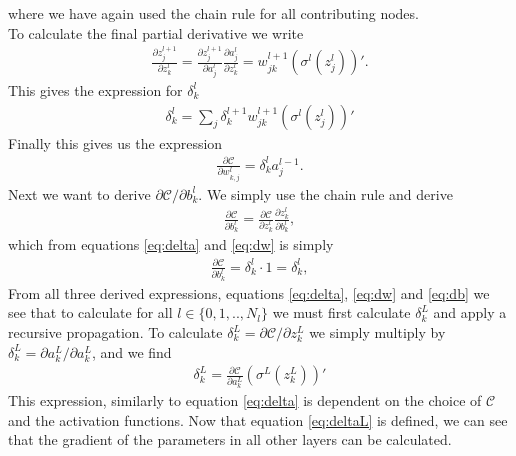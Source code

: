 where we have again used the chain rule for all contributing nodes.
\\
To calculate the final partial derivative we write
\begin{align*}
    \frac{\partial z_j^{l+1}}{\partial z^l_k} = \frac{\partial z_j^{l+1}}{\partial a^l_j}\frac{\partial a^l_j}{\partial z^l_k}
                                              = w_{jk}^{l+1}(\sigma^l(z_j^l))'.
\end{align*}
This gives the expression for $\delta_k^l$
\begin{align}\label{eq:delta}
    \delta_k^l  = \sum_j \delta_k^{l+1}w_{jk}^{l+1}(\sigma^l(z_j^l))'  
\end{align}
Finally this gives us the expression
\begin{align}\label{eq:dw}
    \frac{\partial \mathcal{C}}{\partial w_{k,j}^l} = \delta_k^{l} a_j^{l-1}.
\end{align}
Next we want to derive $\partial \mathcal{C}/\partial b^l_k$. We simply use the chain rule and derive
\begin{align*}
    \frac{\partial \mathcal{C}}{\partial b^l_k} = \frac{\partial \mathcal{C}}{\partial z^l_k}\frac{\partial z_k^l}{\partial b^l_k},
\end{align*}
which from equations \ref{eq:delta} and \ref{eq:dw} is simply
\begin{align}\label{eq:db}
    \frac{\partial \mathcal{C}}{\partial b^l_k} = \delta_k^{l} \cdot 1 = \delta_k^{l},
\end{align}
From all three derived expressions, equations \ref{eq:delta}, \ref{eq:dw} and \ref{eq:db} we see that 
to calculate for all $l\in\{0,1,..,N_l\}$ we must first calculate $\delta_k^L$ and apply a recursive propagation.
To calculate $\delta_k^L = \partial \mathcal{C}/\partial z^L_k$ we simply multiply by $\delta_k^L = \partial a_k^L/\partial a_k^L$, and we find
\begin{align}\label{eq:deltaL}
    \delta_k^L = \frac{\partial \mathcal{C}}{\partial a^L_k}\left(\sigma^L(z_k^L)\right)'
\end{align}
This expression, similarly to equation \ref{eq:delta} is dependent on the choice of $\mathcal{C}$ and 
the activation functions. Now that equation \ref{eq:deltaL} is defined, we can see that the
gradient of the parameters in all other layers can be calculated. 

